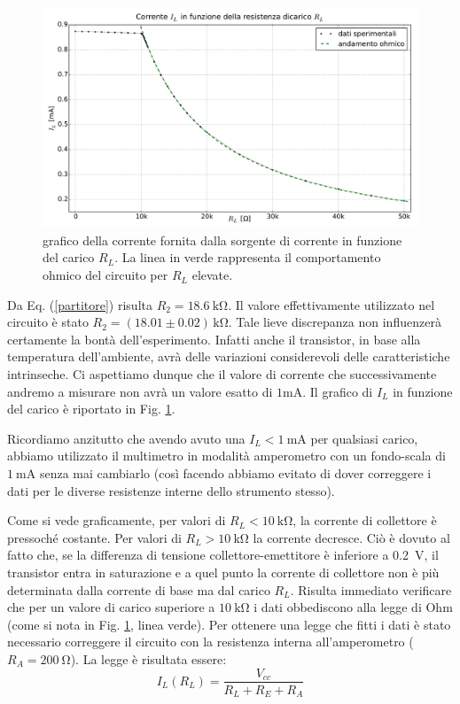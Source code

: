 \begin{figure}[H]
\centering
	\includegraphics[scale=0.45]{sorgente.pdf}
	\caption{grafico della corrente fornita dalla sorgente di corrente in funzione del carico $R_L$. La linea in verde rappresenta il comportamento ohmico del circuito per $R_L$ elevate.}
	\label{fig:sorg}
\end{figure}

Da Eq. (\ref{partitore}) risulta $R_2 = \SI{18.6}{\kilo\ohm} $.
Il valore effettivamente utilizzato nel circuito è stato $R_2 = (18.01 \pm 0.02 )\,\si{\kilo\ohm} $.
Tale lieve discrepanza non influenzerà certamente la bontà dell'esperimento.
Infatti anche il transistor, in base alla temperatura dell'ambiente, avrà delle variazioni considerevoli delle caratteristiche intrinseche.
Ci aspettiamo dunque che il valore di corrente che successivamente andremo a misurare non avrà un valore esatto di $1\si{\milli\ampere}$. 
Il grafico di $I_L$ in funzione del carico è riportato in Fig. \ref{fig:sorg}.

Ricordiamo anzitutto che avendo avuto una $I_L<\SI{1}{\milli\ampere}$ per qualsiasi carico, abbiamo utilizzato il multimetro in modalità amperometro con un fondo-scala di $\SI{1}{\milli\ampere}$ senza mai cambiarlo (così facendo abbiamo evitato di dover correggere i dati per le diverse resistenze interne dello strumento stesso).

Come si vede graficamente, per valori di $R_L<\SI{10}{\kilo\ohm}$, la corrente di collettore è pressoché costante.
Per valori di $R_L>\SI{10}{\kilo\ohm}$ la corrente decresce.
Ciò è dovuto al fatto che, se la differenza di tensione collettore-emettitore è inferiore a \SI{0.2}{\volt}, il transistor entra in saturazione e a quel punto la corrente di  collettore non è più determinata dalla corrente di base ma dal carico $R_L$.
Risulta immediato verificare che  per un valore di carico superiore a $\SI{10}{\kilo\ohm}$ i dati obbediscono alla legge di Ohm (come si nota in Fig. \ref{fig:sorg}, linea verde).
Per ottenere una legge che fitti i dati è stato necessario correggere il circuito con la resistenza interna all'amperometro ($R_A = \SI{200}{\ohm}$).
La legge è risultata essere:
$$		I_L (R_L) =\frac{V_{cc}}{R_L+R_E+R_A}	$$